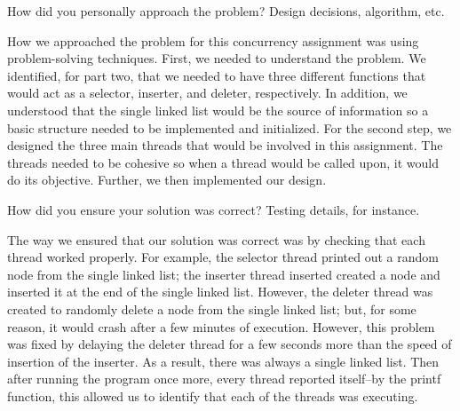 \documentclass{article}
\newenvironment{question}[2][Question]{\begin{trivlist}
\item[\hskip \labelsep {\bfseries #1}\hskip \labelsep {\bfseries #2.}]}{\end{trivlist}}
\begin{document}

\vspace{0.25in} %

\begin{question}{2}
How did you personally approach the problem? Design decisions, algorithm, etc.
\end{question}
How we approached the problem for this concurrency assignment was using problem-solving techniques. First, we needed to understand the problem. We identified, for part two, that we needed to have three different functions that would act as a selector, inserter, and deleter, respectively. In addition, we understood that the single linked list would be the source of information so a basic structure needed to be implemented and initialized. For the second step, we designed the three main threads that would be involved in this assignment. The threads needed to be cohesive so when a thread would be called upon, it would do its objective. Further, we then implemented our design.  


\vspace{0.25in} %

\begin{question}{3}
How did you ensure your solution was correct? Testing details, for instance.
\end{question}
The way we ensured that our solution was correct was by checking that each thread worked properly. For example, the selector thread printed out a random node from the single linked list; the inserter thread inserted created a node and inserted it at the end of the single linked list. However, the deleter thread was created to randomly delete a node from the single linked list; but, for some reason, it would crash after a few minutes of execution. However, this problem was fixed by delaying the deleter thread for a few seconds more than the speed of insertion of the inserter. As a result, there was always a single linked list. Then after running the program once more, every thread reported itself--by the printf function, this allowed us to identify that each of the threads was executing. 

\newpage
\end{document}
